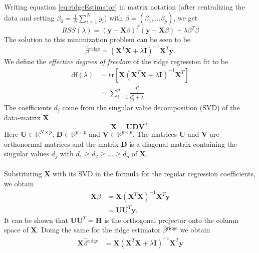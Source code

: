 \begin{itemize}
    Writing equation \eqref{eq:ridgeEstimator} in matrix notation (after centralizing the data and setting $\beta_0 = \frac{1}{N} \sum_{i=1}^N y_i$) with $\beta = (\beta_1, \dots \beta_p)$, we get
    \begin{equation}\label{RidgeMatrixNotation}
        RSS(\lambda) = (\textbf{y} - \textbf{X}\beta)^T(\textbf{y} - \textbf{X}\beta) + \lambda\beta^T\beta
    \end{equation}
    The solution to this minimization problem can be seen to be
    \begin{equation}
        \hat{\beta}{}^{\textrm{ridge}} = (\textbf{X}^T\textbf{X} + \lambda\textbf{I})^{-1}\textbf{X}^T\textbf{y}.
    \end{equation}
    We define the \textit{effective degrees of freedom} of the ridge regression fit to be \begin{align*}
        \textrm{df}(\lambda) & = \textrm{tr}[\textbf{X}(\textbf{X}^T\textbf{X} + \lambda\textbf{I})^{-1}\textbf{X}^T]\\
        & = \sum_{i=1}^p \frac{d_j^2}{d_j^2 + \lambda}
    \end{align*}
    The coefficients $d_j$ come from the singular value decomposition (SVD) of the data-matrix \textbf{X} \begin{equation*}
        \textbf{X} = \textbf{UDV}^T.
    \end{equation*}
    Here $\textbf{U} \in \mathbb{R}^{N \times p}$, $\textbf{D} \in \mathbb{R}^{p \times p}$ and $\textbf{V} \in \mathbb{R}^{p \times p}$. The matrices \textbf{U} and \textbf{V} are orthonormal matrices and the matrix \textbf{D} is a diagonal matrix containing the singular values $d_j$ with $d_1 \geqslant d_2 \geqslant \dots \geqslant d_p$ of \textbf{X}.\\
    \\
    Substituting \textbf{X} with its SVD in the formula for the regular regression coefficients, we obtain
    \begin{align*}
        \textbf{X}\beta &  = \textbf{X}(\textbf{X}^T\textbf{X})^{-1}\textbf{X}^T\textbf{y}\\
        & = \textbf{U}\textbf{U}^T\textbf{y}.
    \end{align*}
    It can be shown that $\textbf{U}\textbf{U}^T = \textbf{H}$ is the orthogonal projector onto the column space of \textbf{X}. Doing the same for the ridge estimator $\hat{\beta}{}^{\textrm{ridge}}$ we obtain
    \begin{align*}
        \textbf{X}\hat{\beta}{}^{\textrm{ridge}} & = \textbf{X}(\textbf{X}^T\textbf{X} + \lambda\textbf{I})^{-1}\textbf{X}^T\textbf{y}\\

\end{align*}
\end{itemize}
